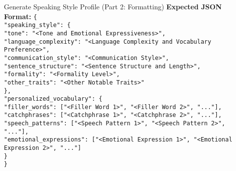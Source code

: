 \begin{figure*}[t]
\begin{AIbox}{Generate Speaking Style Profile (Part 2: Formatting)}
{        \textbf{Expected JSON Format:}\newline
        \texttt{\{\\
          "speaking\_style": \{\\
            "tone": "<Tone and Emotional Expressiveness>",\\
            "language\_complexity": "<Language Complexity and Vocabulary Preference>",\\
            "communication\_style": "<Communication Style>",\\
            "sentence\_structure": "<Sentence Structure and Length>",\\
            "formality": "<Formality Level>",\\
            "other\_traits": "<Other Notable Traits>"\\
          \},\\
          "personalized\_vocabulary": \{\\
            "filler\_words": ["<Filler Word 1>", "<Filler Word 2>", "..."],\\
            "catchphrases": ["<Catchphrase 1>", "<Catchphrase 2>", "..."],\\
            "speech\_patterns": ["<Speech Pattern 1>", "<Speech Pattern 2>", "..."],\\
            "emotional\_expressions": ["<Emotional Expression 1>", "<Emotional Expression 2>", "..."]\\
          \}\\
        \}}
    } %
    \end{AIbox}

    \caption{Speaking style profile generation template - Part 2: Participant information and JSON format.}
    \label{fig:speaking_style_prompt_part2}
\end{figure*}

